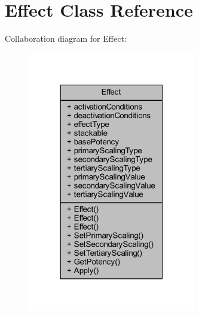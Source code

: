 \hypertarget{class_effect}{}\section{Effect Class Reference}
\label{class_effect}


Collaboration diagram for Effect\+:
\nopagebreak
\begin{figure}[H]
\begin{center}
\leavevmode
\includegraphics[width=208pt]{class_effect__coll__graph}
\end{center}
\end{figure}
